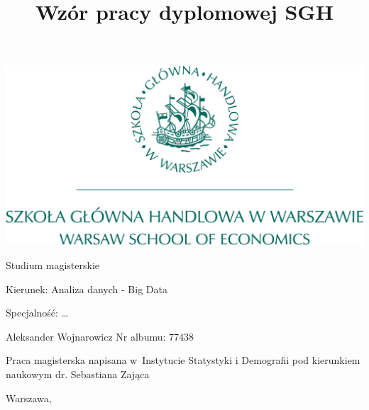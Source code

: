 \documentclass[12pt,a4paper,twoside,openany]{book}
\begin{document}
\begin{center}
\includegraphics[scale=0.3]{sgh_full.png}

\vspace{1cm}

Studium magisterskie
\end{center}

\vspace{1cm}

\noindent Kierunek: Analiza danych - Big Data

\noindent Specjalność: \vphantom{I}\dots

\vspace{1cm}

{
\leftskip=10cm\noindent
Aleksander Wojnarowicz\newline
Nr albumu: 77438

}

\vspace{2cm}

\title{Wzór pracy dyplomowej SGH}
\makeatletter

\begin{center}
\LARGE\bf
\fbox{\@title}
\end{center}

\vspace{2cm}

{
\leftskip=8cm\noindent
Praca magisterska\newline 
napisana w~Instytucie Statystyki i Demografii\newline
pod kierunkiem naukowym\newline
dr. Sebastiana Zająca

}

\vfill

\begin{center}
Warszawa, \the\year
\end{center}
\end{document}
